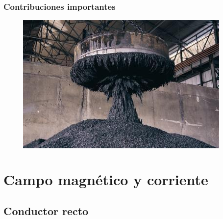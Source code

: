 \documentclass[14pt]{beamer}
\begin{document}
\begin{frame}
\frametitle{Contribuciones importantes}
\begin{figure}
    \centering
    \includegraphics[scale=0.8]{Imagenes/Electromagnetismo_04.jpg}
\end{figure}
\end{frame}

\section{Campo magnético y corriente}
\subsection{Conductor recto}
\end{document}

